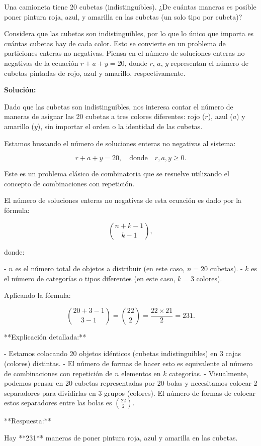 \documentclass[11pt]{scrartcl}
\begin{document}
\begin{problem}
Una camioneta tiene 20 cubetas (indistinguibles). ¿De cuántas maneras es posible poner pintura roja, azul, y amarilla en las cubetas (un solo tipo por cubeta)?

\begin{hint}
Considera que las cubetas son indistinguibles, por lo que lo único que importa es cuántas cubetas hay de cada color. Esto se convierte en un problema de particiones enteras no negativas. Piensa en el número de soluciones enteras no negativas de la ecuación $r + a + y = 20$, donde $r$, $a$, $y$ representan el número de cubetas pintadas de rojo, azul y amarillo, respectivamente.

\begin{solu}
\textbf{Solución:}

Dado que las cubetas son indistinguibles, nos interesa contar el número de maneras de asignar las 20 cubetas a tres colores diferentes: rojo ($r$), azul ($a$) y amarillo ($y$), sin importar el orden o la identidad de las cubetas.

Estamos buscando el número de soluciones enteras no negativas al sistema:

$$
r + a + y = 20, \quad \text{donde} \quad r, a, y \geq 0.
$$

Este es un problema clásico de combinatoria que se resuelve utilizando el concepto de combinaciones con repetición.

El número de soluciones enteras no negativas de esta ecuación es dado por la fórmula:

$$
\binom{n + k - 1}{k - 1},
$$

donde:

- $n$ es el número total de objetos a distribuir (en este caso, $n = 20$ cubetas).
- $k$ es el número de categorías o tipos diferentes (en este caso, $k = 3$ colores).

Aplicando la fórmula:

$$
\binom{20 + 3 - 1}{3 - 1} = \binom{22}{2} = \frac{22 \times 21}{2} = 231.
$$

**Explicación detallada:**

- Estamos colocando 20 objetos idénticos (cubetas indistinguibles) en 3 cajas (colores) distintas.
- El número de formas de hacer esto es equivalente al número de combinaciones con repetición de $n$ elementos en $k$ categorías.
- Visualmente, podemos pensar en 20 cubetas representadas por 20 bolas y necesitamos colocar 2 separadores para dividirlas en 3 grupos (colores). El número de formas de colocar estos separadores entre las bolas es $\binom{22}{2}$.

**Respuesta:**

Hay **231** maneras de poner pintura roja, azul y amarilla en las cubetas.
\end{solu}
\end{hint}
\end{problem}
\end{document}
